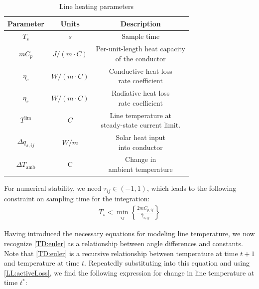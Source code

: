\documentclass[conference]{IEEEtran}
\begin{document}
\begin{table}
\begin{center}
\caption{Line heating parameters}
\label{tab:heatparams}
\begin{tabular}{|c|c|c|}
	\hline
	         Parameter           &   Units    &               Description                \\ \hline
	           $T_s$             &    $s$     &               Sample time                \\ \hline
	           $mC_p$            & $J/(m\cdot C)$ & \splitcell{Per-unit-length heat capacity\\of the conductor}         \\ \hline
	          $\eta_c$           & $W/(m\cdot C)$ &     \splitcell{Conductive heat loss \\ rate coefficient}         \\ \hline
	          $\eta_r$           & $W/(m\cdot C)$ &      \splitcell{Radiative heat loss\\rate coefficient}         \\ \hline
	       $T^\text{lim}$        &    $C$     &      \splitcell{Line temperature at\\steady-state current limit.}   \\ \hline
	       $\Delta q_{s,ij}$ & $W/m$ & \splitcell{Solar heat input\\ into conductor} \\ \hline
	       $\Delta T_\text{amb}$ & C & \splitcell{Change in \\ambient temperature} \\ \hline
\end{tabular} 
\end{center}
\end{table}

For numerical stability, we need $\tau_{ij}\in(-1,1)$, which leads to the following constraint on sampling time for the integration:
\begin{align}
\label{TD:sample}
T_s < \min_{ij}\left\lbrace \frac{2mC_{p,ij}}{\bar{\gamma}_{c,ij}}\right\rbrace
\end{align}

Having introduced the necessary equations for modeling line temperature, we now recognize \eqref{TD:euler} as a relationship between angle differences and constants. Note that \eqref{TD:euler} is a recursive relationship between temperature at time $t+1$ and temperature at time $t$. Repeatedly substituting into this equation and using \eqref{LL:activeLoss}, we find the following expression for change in line temperature at time $t^*$:
%
\end{document}
